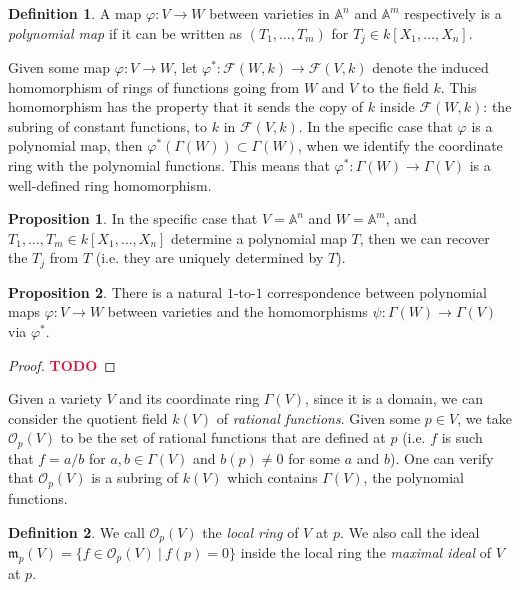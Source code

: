 \documentclass[aps,pra,showpacs,notitlepage,onecolumn,superscriptaddress,nofootinbib]{revtex4-1}
\newcommand{\pop}[1]{\textcolor{crimson}{#1}}
\theoremstyle{definition}
\newtheorem{definition}{Definition}[section]
\newtheorem{prop}{Proposition}[section]
\begin{document}
\begin{definition}
  A map $\varphi : V \rightarrow W$ between varieties in $\mathbb{A}^n$ and $\mathbb{A}^m$ respectively is a \emph{polynomial map} if
  it can be written as $(T_1, \dots, T_m)$ for $T_j \in k[X_1, \dots, X_n]$.
  \end{definition}

\noindent Given some map $\varphi : V \rightarrow W$, let $\varphi^{*} : \mathcal{F}(W, k) \rightarrow \mathcal{F}(V, k)$ denote the induced homomorphism
of rings of functions going from $W$ and $V$ to the field $k$. This homomorphism has the property that it sends the copy of $k$ inside $\mathcal{F}(W, k)$: the
subring of constant functions, to $k$ in $\mathcal{F}(V, k)$. In the specific case that $\varphi$ is a polynomial map, then $\varphi^{*}(\Gamma(W)) \subset \Gamma(W)$,
when we identify the coordinate ring with the polynomial functions. This means that $\varphi^{*} : \Gamma(W) \rightarrow \Gamma(V)$ is a well-defined ring homomorphism.

\begin{prop}
In the specific case that $V = \mathbb{A}^n$ and $W = \mathbb{A}^m$, and $T_1, \dots, T_m \in k[X_1, \dots, X_n]$ determine a polynomial map $T$, then we can
recover the $T_j$ from $T$ (i.e. they are uniquely determined by $T$).
  \end{prop}

\begin{prop}
There is a natural $1$-to-$1$ correspondence between polynomial maps $\varphi : V \rightarrow W$ between varieties and the homomorphisms $\psi : \Gamma(W) \rightarrow \Gamma(V)$
via $\varphi^{*}$.
  \end{prop}

\begin{proof}
  \pop{\textbf{TODO}}
  \end{proof}

\noindent Given a variety $V$ and its coordinate ring $\Gamma(V)$, since it is a domain, we can consider the quotient field $k(V)$ of \emph{rational functions}. Given
some $p \in V$, we take $\mathcal{O}_p(V)$ to be the set of rational functions that are defined at $p$ (i.e. $f$ is such that $f = a/b$ for $a, b \in \Gamma(V)$ and $b(p) \neq 0$ for some $a$ and $b$).
One can verify that $\mathcal{O}_p(V)$ is a subring of $k(V)$ which contains $\Gamma(V)$, the polynomial functions.

\begin{definition}
We call $\mathcal{O}_p(V)$ the \emph{local ring} of $V$ at $p$. We also call the ideal $\mathfrak{m}_p(V) = \{ f \in \mathcal{O}_p(V) \ | \ f(p) = 0 \}$ inside the local
ring the \emph{maximal ideal} of $V$ at $p$.
\end{definition}
\end{document}
